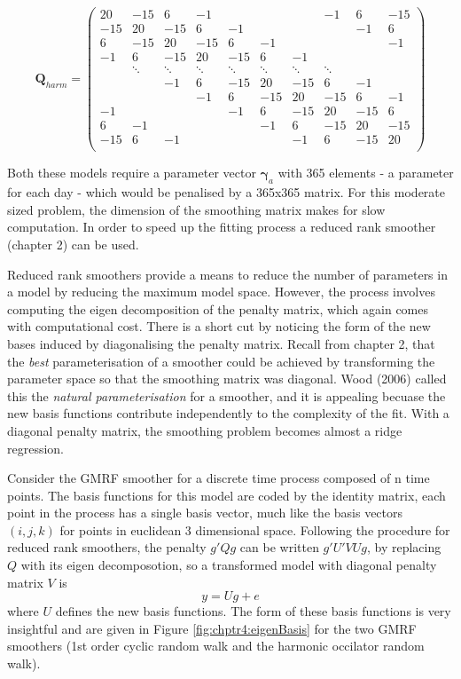 \begin{equation}
\bm{Q}_{harm} = 
\begin{pmatrix} 
20 & -15 & 6 & -1 &  &  &  & -1 & 6 & -15 \\ 
-15 & 20 & -15 & 6 & -1 &  &  &  & -1 & 6 \\ 
6 & -15 & 20 & -15 & 6 & -1 &  &  &  & -1 \\ 
-1 & 6 & -15 & 20 & -15 & 6 & -1 &  &  &  \\ 
 & \ddots & \ddots & \ddots & \ddots & \ddots & \ddots & \ddots &  &  \\ 
 &  & -1 & 6 & -15 & 20 & -15 & 6 & -1 &  \\ 
 &  &  & -1 & 6 & -15 & 20 & -15 & 6 & -1 \\ 
-1 &  &  &  & -1 & 6 & -15 & 20 & -15 & 6 \\ 
6 & -1 &  &  &  & -1 & 6 & -15 & 20 & -15 \\ 
-15 & 6 & -1 &  &  &  & -1 & 6 & -15 & 20 \\ 
\end{pmatrix}
\end{equation}


Both these models require a parameter vector $\bm{\gamma}_a$ with 365 elements - a parameter for each day - which would be penalised by a 365x365 matrix.  For this moderate sized problem, the dimension of the smoothing matrix makes for slow computation.  In order to speed up the fitting process a reduced rank smoother (chapter 2) can be used.  

Reduced rank smoothers provide a means to reduce the number of parameters in a model by reducing the maximum model space.  However, the process involves computing the eigen decomposition of the penalty matrix, which again comes with computational cost.  There is a short cut by noticing the form of the new bases induced by diagonalising the penalty matrix.  Recall from chapter 2, that the \textit{best} parameterisation of a smoother could be achieved by transforming the parameter space so that the smoothing matrix was diagonal.  Wood (2006) called this the \textit{natural parameterisation} for a smoother, and it is appealing becuase the new basis functions contribute independently to the complexity of the fit.  With a diagonal penalty matrix, the smoothing problem becomes almost a ridge regression.

Consider the GMRF smoother for a discrete time process composed of n time points. The basis functions for this model are coded by the identity matrix, each point in the process has a single basis vector, much like the basis vectors $(i, j, k)$ for points in euclidean 3 dimensional space. Following the procedure for reduced rank smoothers, the penalty $g'Qg$ can be written $g'U'VUg$, by replacing $Q$ with its eigen decomposotion, so a transformed model with diagonal penalty matrix $V$ is
\begin{equation}
  y = Ug + e
\end{equation}
where $U$ defines the new basis functions.  The form of these basis functions is very insightful and are given in Figure \ref{fig:chptr4:eigenBasis} for the two GMRF smoothers (1st order cyclic random walk and the harmonic occilator random walk).


